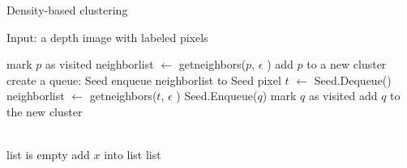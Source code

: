 \begin{algorithm}[t]
 \caption{Density-based clustering}
 
\begin{algorithmic}
 \State Input: a depth image with labeled pixels

      \State mark $p$ as visited
         \State neighbor\textunderscore list $\gets$ get\textunderscore neighbors($p$, $\epsilon$ )
            \State add $p$ to a new cluster
            \State create a queue: Seed
            \State enqueue neighbor\textunderscore list to Seed
                \State pixel $t$ $\gets$ Seed.Dequeue()
                \State neighbor\textunderscore list $\gets$ get\textunderscore neighbors($t$, $\epsilon$ )
                      \State Seed.Enqueue($q$)
                      \State mark $q$ as visited
                      \State add $q$ to the new cluster
                    \EndIf
                   \EndFor 
                \EndIf
            \EndWhile
         \EndIf

  \EndFor
\\
	\State list is empty	
			\State add $x$ into list
		\EndIf 	
 	\EndFor 
 	\Return list
\EndFunction

\end{algorithmic}
\end{algorithm}


